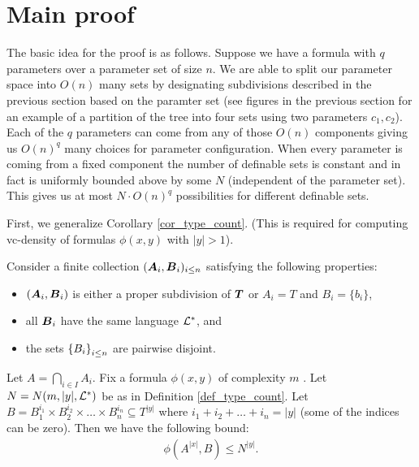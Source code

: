 \section{Main proof}
The basic idea for the proof is as follows.
Suppose we have a formula with $q$ parameters over a parameter set of size $n$.
We are able to split our parameter space into $O(n)$ many sets
by designating subdivisions described in the previous section based on the paramter set
(see figures in the previous section for an example of a partition of the tree into four sets using two parameters $c_1, c_2$).
Each of the $q$ parameters can come from any of those $O(n)$ components giving us $O(n)^q$ many choices for parameter configuration.
When every parameter is coming from a fixed component the number of definable sets is constant and in fact is uniformly bounded above by some $N$
(independent of the parameter set).
This gives us at most $N \cdot O(n)^q$ possibilities for different definable sets.

First, we generalize Corollary \ref{cor_type_count}.
(This is required for computing vc-density of formulas $\phi(x, y)$ with $|y| > 1$).

\begin{Lemma} \label{lm_partition_bound}
  Consider a finite collection $(\operatorname{\boldsymbol A}_i, \operatorname{\boldsymbol B}_i)_{i \leq n}$ satisfying the following properties:
  \begin{itemize}
  \item $(\operatorname{\boldsymbol A}_i, \operatorname{\boldsymbol B}_i)$ is either a proper subdivision of $\operatorname{\boldsymbol T}$ or $A_i = T$ and $B_i = \{b_i\}$,
  \item all $\operatorname{\boldsymbol B}_i$ have the same language $\mathcal L^*$, and 
  \item the sets $\left\{B_i\right\}_{i \leq n}$ are pairwise disjoint.
  \end{itemize}
  Let $A = \bigcap_{i \in I} A_i$.
  Fix a formula $\phi(x, y)$ of complexity $m$ . Let $N = N(m, |y|, \mathcal L^*)$ be as in Definition \ref{def_type_count}.
  Let $B = B_1^{i_1} \times B_2^{i_2} \times \ldots \times B_n^{i_n} \subseteq T^{|y|}$ where $i_1 + i_2 + \ldots + i_n = |y|$
  (some of the indices can be zero). Then we have the following bound:
  \begin{align*}
    \phi(A^{|x|}, B) \leq N^{|y|}.
  \end{align*}
\end{Lemma}

